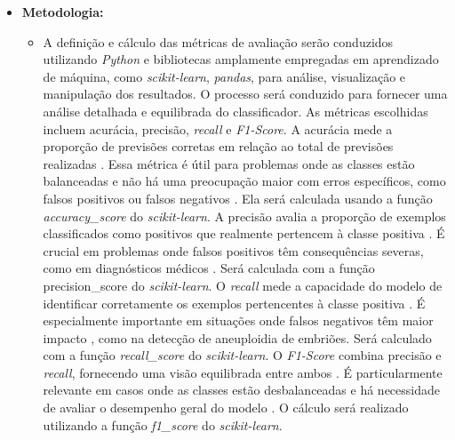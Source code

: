 \begin{itemize}
\begin{itemize}
\begin{itemize}
\begin{itemize}
        \item \textbf{Metodologia:} 
        \begin{itemize}
          \item A definição e cálculo das métricas de avaliação serão conduzidos utilizando \textit{Python} e bibliotecas amplamente empregadas em aprendizado de máquina, como \textit{scikit-learn}, \textit{pandas}, para análise, visualização e manipulação dos resultados. O processo será conduzido para fornecer uma análise detalhada e equilibrada do classificador. As métricas escolhidas incluem acurácia, precisão, \textit{recall} e \textit{F1-Score}. A acurácia mede a proporção de previsões corretas em relação ao total de previsões realizadas \cite{vilela2022}. Essa métrica é útil para problemas onde as classes estão balanceadas e não há uma preocupação maior com erros específicos, como falsos positivos ou falsos negativos \cite{vilela2022}. Ela será calculada usando a função \textit{accuracy_score} do \textit{scikit-learn}. A precisão avalia a proporção de exemplos classificados como positivos que realmente pertencem à classe positiva \cite{vilela2022}. É crucial em problemas onde falsos positivos têm consequências severas, como em diagnósticos médicos \cite{vilela2022}. Será calculada com a função precision_score do \textit{scikit-learn}. O \textit{recall} mede a capacidade do modelo de identificar corretamente os exemplos pertencentes à classe positiva \cite{vilela2022}. É especialmente importante em situações onde falsos negativos têm maior impacto \cite{vilela2022}, como na detecção de aneuploidia de embriões. Será calculado com a função \textit{recall_score} do \textit{scikit-learn}. O \textit{F1-Score} combina precisão e \textit{recall}, fornecendo uma visão equilibrada entre ambos \cite{vilela2022}. É particularmente relevante em casos onde as classes estão desbalanceadas e há necessidade de avaliar o desempenho geral do modelo \cite{vilela2022}. O cálculo será realizado utilizando a função \textit{f1_score} do \textit{scikit-learn}.
        \end{itemize}


\end{itemize}
\end{itemize}
\end{itemize}
\end{itemize}
